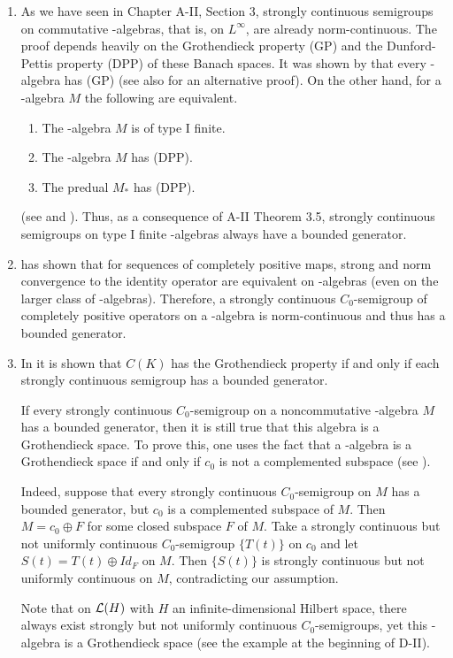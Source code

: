 \begin{enumerate}

\item 
As we have seen in Chapter A-II, Section 3, strongly continuous semigroups on commutative \WA-algebras, that is, on $L^{\infty}$, are already norm-continuous. 
The proof depends heavily on the Grothendieck property (GP) and the Dunford-Pettis property (DPP) of these Banach spaces. 
It was shown by  that every \WA-algebra has (GP) (see also  for an alternative proof).
On the other hand, for a \WA-algebra $M$ the following are equivalent.
\begin{enumerate}[\upshape(a)]
    \item The \WA-algebra $M$ is of type I finite.
    \item The \WA-algebra $M$ has (DPP).
    \item The predual $M_{*}$ has (DPP).
\end{enumerate}
(see  and ).
Thus, as a consequence of A-II Theorem 3.5, strongly continuous semigroups on type I finite \WA-algebras always have a bounded generator. 

\item
{} has shown that for sequences of completely positive maps, strong and norm convergence to the identity operator are equivalent on \WA-algebras (even on the larger class of \AW-algebras).
Therefore, a strongly continuous $C_{0}$-semigroup of completely positive operators on a \WA-algebra is norm-continuous and thus has a bounded generator.

\item 
In  it is shown that $C(K)$ has the Grothendieck property if and only if each strongly continuous semigroup has a bounded generator. 

If every strongly continuous $C_{0}$-semigroup on a noncommutative \CA-algebra $M$ has a bounded generator, then it is still true that this algebra is a Grothendieck space. 
To prove this, one uses the fact that a \CA-algebra is a Grothendieck space if and only if $c_{0}$ is not a complemented subspace (see ).

Indeed, suppose that every strongly continuous $C_{0}$-semigroup on $M$ has a bounded generator, but $c_{0}$ is a complemented subspace of $M$.
Then $M = c_{0} \oplus F$ for some closed subspace $F$ of $M$.
Take a strongly continuous but not uniformly continuous $C_{0}$-semigroup $\{T(t)\}$ on $c_{0}$ and let $S(t) = T(t) \oplus Id_{F}$ on $M$. 
Then $\{S(t)\}$ is strongly continuous but not uniformly continuous on $M$, contradicting our assumption.

Note that on $\mathcal{L}(H)$ with $H$ an infinite-dimensional Hilbert space, there always exist strongly but not uniformly continuous $C_{0}$-semigroups, yet this \WA-algebra is a Grothendieck space (see the example at the beginning of D-II).
\end{enumerate}
